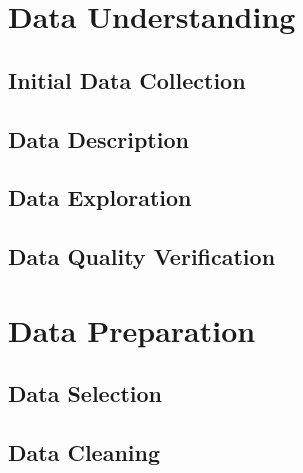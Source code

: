 \section{Data Understanding}

\subsection{Initial Data Collection}

\subsection{Data Description}

\subsection{Data Exploration}

\subsection{Data Quality Verification}

\section{Data Preparation}

\subsection{Data Selection}

\subsection{Data Cleaning}

